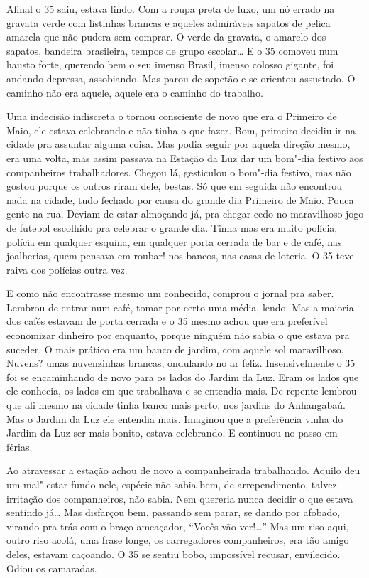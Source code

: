 Afinal o 35 saiu, estava lindo. Com a roupa preta de luxo, um nó errado
na gravata verde com listinhas brancas e aqueles admiráveis sapatos de
pelica amarela que não pudera sem comprar. O verde da gravata, o amarelo
dos sapatos, bandeira brasileira, tempos de grupo escolar\ldots{} E o 35
comoveu num hausto forte, querendo bem o seu imenso Brasil, imenso
colosso gigante, foi andando depressa, assobiando. Mas parou de sopetão
e se orientou assustado. O caminho não era aquele, aquele era o caminho
do trabalho.

Uma indecisão indiscreta o tornou consciente de novo que era o Primeiro
de Maio, ele estava celebrando e não tinha o que fazer. Bom, primeiro
decidiu ir na cidade pra assuntar alguma coisa. Mas podia seguir por
aquela direção mesmo, era uma volta, mas assim passava na Estação da Luz
dar um bom"-dia festivo aos companheiros trabalhadores. Chegou lá,
gesticulou o bom"-dia festivo, mas não gostou porque os outros riram
dele, bestas. Só que em seguida não encontrou nada na cidade, tudo
fechado por causa do grande dia Primeiro de Maio. Pouca gente na rua.
Deviam de estar almoçando já, pra chegar cedo no maravilhoso jogo de
futebol escolhido pra celebrar o grande dia. Tinha mas era muito
polícia, polícia em qualquer esquina, em qualquer porta cerrada de bar e
de café, nas joalherias, quem pensava em roubar! nos bancos, nas casas
de loteria. O 35 teve raiva dos polícias outra vez.

E como não encontrasse mesmo um conhecido, comprou o jornal pra saber.
Lembrou de entrar num café, tomar por certo uma média, lendo. Mas a
maioria dos cafés estavam de porta cerrada e o 35 mesmo achou que era
preferível economizar dinheiro por enquanto, porque ninguém não sabia o
que estava pra suceder. O mais prático era um banco de jardim, com
aquele sol maravilhoso. Nuvens? umas nuvenzinhas brancas, ondulando no
ar feliz. Insensivelmente o 35 foi se encaminhando de novo para os lados
do Jardim da Luz. Eram os lados que ele conhecia, os lados em que
trabalhava e se entendia mais. De repente lembrou que ali mesmo na
cidade tinha banco mais perto, nos jardins do Anhangabaú. Mas o Jardim
da Luz ele entendia mais. Imaginou que a preferência vinha do Jardim da
Luz ser mais bonito, estava celebrando. E continuou no passo em férias.

Ao atravessar a estação achou de novo a companheirada trabalhando.
Aquilo deu um mal"-estar fundo nele, espécie não sabia bem, de
arrependimento, talvez irritação dos companheiros, não sabia. Nem
quereria nunca decidir o que estava sentindo já\ldots{} Mas disfarçou bem,
passando sem parar, se dando por afobado, virando pra trás com o braço
ameaçador, ``Vocês vão ver!\ldots{}'' Mas um riso aqui, outro riso acolá, uma
frase longe, os carregadores companheiros, era tão amigo deles, estavam
caçoando. O 35 se sentiu bobo, impossível recusar, envilecido. Odiou os
camaradas.

